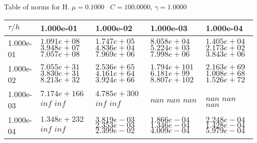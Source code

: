 \begin{center}
Table of norms for H. $\mu = 0.1000$ \, $C = 100.0000$, $\gamma = 1.0000$
  
\begin{tabular}{|p{1in}|p{1in}|p{1in}|p{1in}|p{1in}|} \hline
$\tau / h$ &1.000e-01 &1.000e-02 &1.000e-03 &1.000e-04 \\ \hline 
1.000e-01 & $1.091e+08$  $3.948e+07$  $7.057e+08$  & $1.747e+05$  $4.836e+04$  $7.969e+06$  & $8.058e+04$  $5.224e+03$  $7.998e+06$  & $1.405e+04$  $2.173e+02$  $3.843e+06$  \\ \hline 
1.000e-02 & $7.055e+31$  $3.830e+31$  $8.213e+32$  & $2.536e+65$  $4.161e+64$  $3.924e+66$  & $1.794e+101$  $6.181e+99$  $8.807e+102$  & $2.163e+69$  $1.008e+68$  $1.526e+72$  \\ \hline 
1.000e-03 & $7.174e+166$  $inf$  $inf$  & $4.785e+300$  $inf$  $inf$  & $nan$  $nan$  $nan$  & $nan$  $nan$  $nan$  \\ \hline 
1.000e-04 & $1.348e+232$  $inf$  $inf$  & $3.819e-03$  $2.353e-03$  $2.399e-02$  & $1.866e-04$  $1.346e-04$  $4.009e-04$  & $2.248e-04$  $1.428e-04$  $5.979e-04$  \\ \hline 

\end{tabular}\\[20pt]
\end{center}
